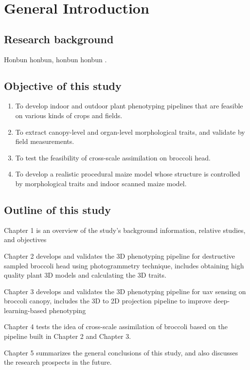 \chapter{General Introduction}

\section{Research background}

Honbun honbun, honbun honbun \citep{guo_deep_2019, zhao_crop_2019}. 


\section{Objective of this study}

\begin{enumerate}
    \item To develop indoor and outdoor plant phenotyping pipelines that are feasible on various kinds of crops and fields. 
    \item To extract canopy-level and organ-level morphological traits, and validate by field measurements.
    \item To test the feasibility of cross-scale assimilation on broccoli head.
    \item To develop a realistic procedural maize model whose structure is controlled by morphological traits and indoor scanned maize model.
\end{enumerate}


\section{Outline of this study}

Chapter 1 is an overview of the study's background information, relative studies, and objectives

Chapter 2 develops and validates the 3D phenotyping pipeline for destructive sampled broccoli head using photogrammetry technique, includes obtaining high quality plant 3D models and calculating the 3D traits.

Chapter 3 develops and validates the 3D phenotyping pipeline for \gls{uav} sensing on broccoli canopy, includes the 3D to 2D projection pipeline to improve deep-learning-based phenotyping

Chapter 4 tests the idea of cross-scale assimilation of broccoli based on the pipeline built in Chapter 2 and Chapter 3.

Chapter 5 summarizes the general conclusions of this study, and also discusses the research prospects in the future.